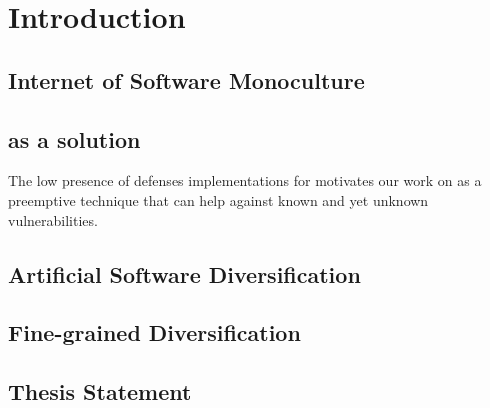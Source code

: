 \chapter{Introduction}






\newcommand{\subscript}[2]{$#1 _ #2$}

\newcommand{\rqone}{RQ1. To what extent can we artifically generate program variants for \wasm?}

\newcommand{\rqtwo}{RQ2. To what extent are the generated variants dynamically different?}
\newcommand{\rqthree}{RQ3. To what extent do the artificial variants exhibit different execution times on Edge-Cloud platforms?}


\section*{Internet of Software Monoculture}

\section*{as a solution}

The low presence of defenses implementations for \wasm motivates our work on as a preemptive technique that can help against known and yet unknown vulnerabilities.

\section*{Artificial Software Diversification}


\section*{Fine-grained Diversification}

\section{Thesis Statement}


